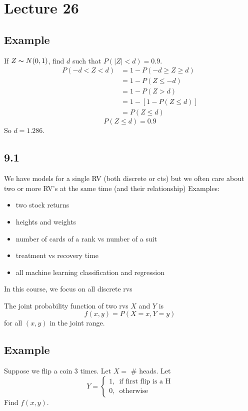 \section{Lecture 26}
\subsection{Example}
If $ Z \thicksim N(0,1) $, find $ d $ such that $ P(|Z|<d)=0.9 $.
\begin{align*}
    P(-d<Z<d)&=1-P(-d\ge Z\ge d)\\
    &=1-P(Z\le -d)\\
    &=1-P(Z>d)\\
    &=1-[1-P(Z\le d)]\\
    &=P(Z\le d)
\end{align*}
\[ P(Z\le d)=0.9\]
So $ d=1.286 $.

\subsection{9.1}
We have models for a single RV (both discrete or cts) but we often
care about two or more RV's at the same time (and their relationship)
Examples:
\begin{itemize}
    \item two stock returns
    \item heights and weights
    \item number of cards of a rank vs number of a suit
    \item treatment vs recovery time
    \item all machine learning classification and regression
\end{itemize}
In this course, we focus on all discrete rvs

\begin{defbox}
    The joint probability function of two rvs $ X $ and $ Y $ is
    \[ f(x,y)=P(X=x,Y=y) \]
    for all $ (x,y) $ in the joint range.
\end{defbox}

\subsection{Example}
Suppose we flip a coin 3 times. Let $ X= $ \# heads.
Let
\[ Y=\begin{cases}
    1,\,\text{ if first flip is a H}\\
    0,\, \text{ otherwise}
\end{cases} \]
Find $ f(x,y) $.

